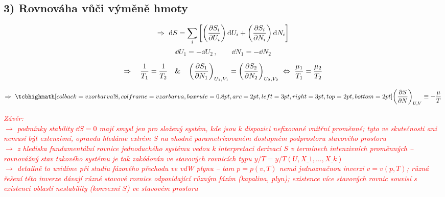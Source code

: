 \subsection*{3) Rovnováha vůči výměně hmoty}

\begin{minipage}{0.45\textwidth}
\end{minipage}
\begin{minipage}{0.53\textwidth}
\[
  \Rightarrow\ \dd S = \sum_i\left[\left(\pdv{S_i}{U_i}\right)\dd U_i + \left(\pdv{S_i}{N_i}\right)\dd N_i\right]
\]
\[
  \dd U_1 = -\dd U_2\,, \qquad \dd N_1 = -\dd N_2
\]
\end{minipage}

\[
  \Rightarrow\quad \frac{1}{T_1} = \frac{1}{T_2}
  \quad\&\quad
  \left(\pdv{S_1}{N_1}\right)_{U_1,V_1} = \left(\pdv{S_2}{N_2}\right)_{U_2,V_2}
  \ \Leftrightarrow\ \frac{\mu_1}{T_1} = \frac{\mu_2}{T_2}
\]

\begin{minipage}{0.38\textwidth}
\begin{definice}
\[ \Rightarrow\ \vzorec{\left(\pdv{S}{N}\right)_{U,V} \equiv -\frac{\mu}{T}} \]
\end{definice}
\end{minipage}\hfill
\begin{minipage}{0.6\textwidth}
\textcolor{Red}{\scriptsize\itshape Závěr: \\
$\to$ podmínky stability $\dd S = 0$ mají smysl jen pro složený systém, kde jsou k dispozici nefixované vnitřní proměnné; tyto ve skutečnosti ani nemusí být extenzivní, opravdu hledáme extrém $S$ na vhodně parametrizovaném dostupném podprostoru stavového prostoru \\
$\to$ z hlediska fundamentální rovnice jednoduchého systému vedou k interpretaci derivací $S$ v termínech intenzivních proměnných -- rovnovážný stav takového systému je tak zakódován ve stavových rovnicích typu $y/T = y/T(U, X\_1,\dots,X\_k)$ \\
$\to$ detailně to uvidíme při studiu fázového přechodu ve vdW plynu -- tam $p = p(v,T)$ nemá jednoznačnou inverzi $v = v(p,T)$; různá řešení této inverze dávají různé stavové rovnice odpovídající různým fázím (kapalina, plyn); existence více stavových rovnic souvisí s existencí oblastí nestability (konvexní $S$) ve stavovém prostoru}
\end{minipage}

